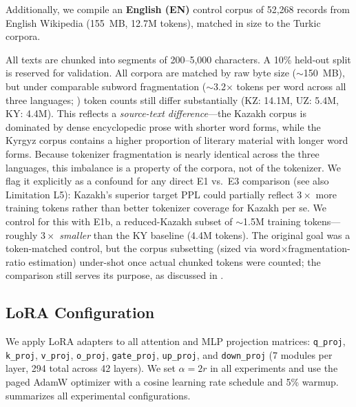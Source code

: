 \documentclass[11pt]{article}
\begin{document}
Additionally, we compile an \textbf{English (EN)} control corpus of 52,268 records from English Wikipedia (155~MB, 12.7M tokens), matched in size to the Turkic corpora.

All texts are chunked into segments of 200--5,000 characters. A 10\% held-out split is reserved for validation. All corpora are matched by raw byte size ($\sim$150~MB), but under comparable subword fragmentation ($\sim$3.2$\times$ tokens per word across all three languages; ) token counts still differ substantially (KZ: 14.1M, UZ: 5.4M, KY: 4.4M). This reflects a \emph{source-text difference}---the Kazakh corpus is dominated by dense encyclopedic prose with shorter word forms, while the Kyrgyz corpus contains a higher proportion of literary material with longer word forms. Because tokenizer fragmentation is nearly identical across the three languages, this imbalance is a property of the corpora, not of the tokenizer. We flag it explicitly as a confound for any direct E1 vs.\ E3 comparison (see also Limitation L5): Kazakh's superior target PPL could partially reflect $3\times$ more training tokens rather than better tokenizer coverage for Kazakh per se. We control for this with E1b, a reduced-Kazakh subset of $\sim$1.5M training tokens---roughly $3\times$ \emph{smaller} than the KY baseline (4.4M tokens). The original goal was a token-matched control, but the corpus subsetting (sized via word$\times$fragmentation-ratio estimation) under-shot once actual chunked tokens were counted; the comparison still serves its purpose, as discussed in .

\subsection{LoRA Configuration}

We apply LoRA adapters to all attention and MLP projection matrices: \texttt{q\_proj}, \texttt{k\_proj}, \texttt{v\_proj}, \texttt{o\_proj}, \texttt{gate\_proj}, \texttt{up\_proj}, and \texttt{down\_proj} (7 modules per layer, 294 total across 42 layers). We set $\alpha = 2r$ in all experiments and use the paged AdamW optimizer with a cosine learning rate schedule and 5\% warmup.  summarizes all experimental configurations.
\end{document}
